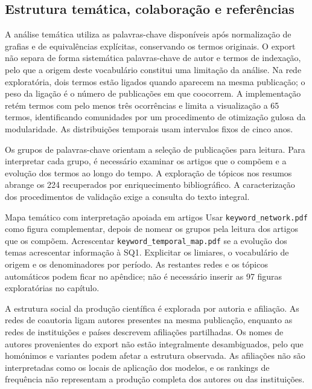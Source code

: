 \subsection{Estrutura temática, colaboração e referências}

A análise temática utiliza as palavras-chave disponíveis após
normalização de grafias e de equivalências explícitas, conservando
os termos originais. O export não separa de forma sistemática
palavras-chave de autor e termos de indexação, pelo que a origem
deste vocabulário constitui uma limitação da análise. Na rede
exploratória, dois termos estão ligados quando aparecem na mesma
publicação; o peso da ligação é o número de publicações em que
coocorrem. A implementação retém termos com pelo menos três
ocorrências e limita a visualização a 65 termos, identificando
comunidades por um procedimento de otimização gulosa da modularidade.
As distribuições temporais usam intervalos fixos de cinco anos.

Os grupos de palavras-chave orientam a seleção de publicações para
leitura. Para interpretar cada grupo, é necessário examinar os artigos
que o compõem e a evolução dos termos ao longo do tempo. A exploração
de tópicos nos resumos abrange os 224 recuperados por enriquecimento
bibliográfico. A caracterização dos procedimentos de validação exige
a consulta do texto integral.

{Mapa temático com interpretação apoiada em artigos}
{Usar \texttt{keyword\_network.pdf} como figura complementar,
depois de nomear os grupos pela leitura dos artigos que os
compõem. Acrescentar \texttt{keyword\_temporal\_map.pdf}
se a evolução dos temas acrescentar informação à SQ1. Explicitar
os limiares, o vocabulário de origem e os denominadores por período.
As restantes redes e os tópicos automáticos podem ficar no apêndice;
não é necessário inserir as 97 figuras exploratórias no capítulo.}%

A estrutura social da produção científica é explorada por autoria
e afiliação. As redes de coautoria ligam autores presentes na
mesma publicação, enquanto as redes de instituições e países
descrevem afiliações partilhadas. Os nomes de autores provenientes
do export não estão integralmente desambiguados, pelo que
homónimos e variantes podem afetar a estrutura observada. As
afiliações não são interpretadas como os locais de aplicação
dos modelos, e os rankings de frequência não representam a
produção completa dos autores ou das instituições.

